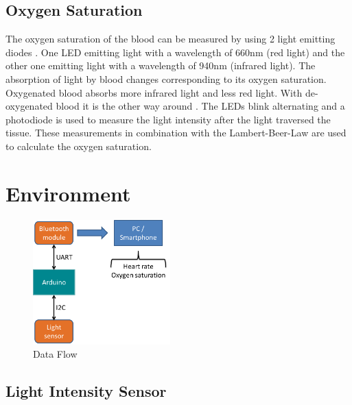 \documentclass[fontsize=12pt,toc=bibliography, notitlepage]{scrreprt}
\begin{document}
\section{Oxygen Saturation}
\label{sec:oxygen-saturation}
The oxygen saturation of the blood can be measured by using 2 light emitting diodes . One LED emitting light with a wavelength of 660nm (red light) and the other one emitting light with a wavelength of 940nm (infrared light). The absorption of light by blood changes corresponding to its oxygen saturation. Oxygenated blood absorbs more infrared light and less red light. With de-oxygenated blood it is the other way around \cite{bib:pulse-oximetry}. The LEDs blink alternating and a photodiode is used to measure the light intensity after the light traversed the tissue. These measurements in combination with the Lambert-Beer-Law are used to calculate the oxygen saturation.

\chapter{Environment}
\label{chap:environment}

\begin{figure}[H]
	\centering
	\includegraphics[width=200px]{images/general_dataFlow.png}
	\caption{Data Flow}
	\label{fig:data-flow}
\end{figure}

\section{Light Intensity Sensor}
\label{sec:light-intensity-sensor}
\end{document}

